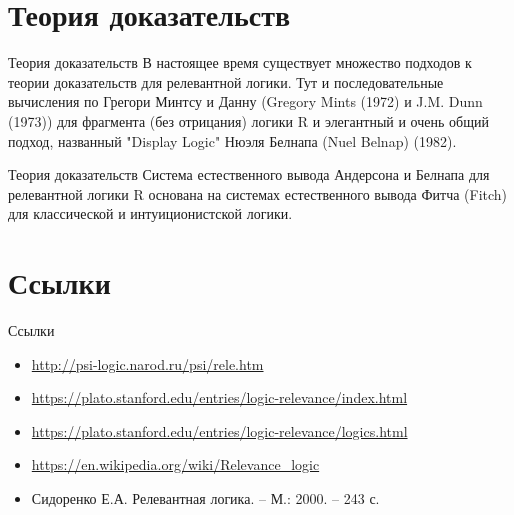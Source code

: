 \documentclass[14pt]{beamer}
\begin{document}
\section{Теория доказательств}

\begin{frame}[nologo]{Теория доказательств}
В настоящее время существует множество подходов к теории доказательств для 
релевантной логики. Тут и последовательные вычисления по Грегори Минтсу и Данну 
(Gregory Mints (1972) и J.M. Dunn (1973)) для фрагмента (без отрицания) логики 
R и элегантный и очень общий подход, названный "Display Logic" Нюэля Белнапа 
(Nuel Belnap) (1982).
\end{frame}

\begin{frame}[nologo]{Теория доказательств}
Система естественного вывода Андерсона и Белнапа для релевантной логики R 
основана на системах естественного вывода Фитча (Fitch) для классической и 
интуиционистской логики.
\end{frame}

\section{Ссылки}

\begin{frame}[nologo]{Ссылки}
\begin{itemize}
	\item \url{http://psi-logic.narod.ru/psi/rele.htm}
	\item \url{https://plato.stanford.edu/entries/logic-relevance/index.html}
	\item \url{https://plato.stanford.edu/entries/logic-relevance/logics.html}
	\item \url{https://en.wikipedia.org/wiki/Relevance_logic}
	\item Сидоренко Е.А. Релевантная логика. -- М.: 2000. -- 243 с.
\end{itemize}
\end{frame}

\itmothankyou
\end{document}

